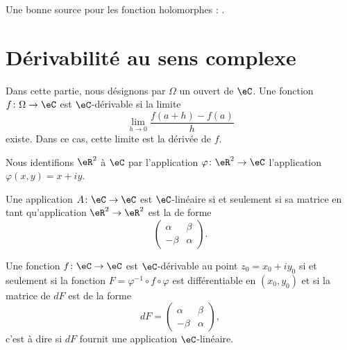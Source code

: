 
Une bonne source pour les fonction holomorphes : \cite{Holomorphieus}.

\section{Dérivabilité au sens complexe}

Dans cette partie, nous désignons par \( \Omega\) un ouvert de \( \eC\). Une fonction \( f\colon \Omega\to \eC\) est $\eC$-dérivable si la limite
\begin{equation}
    \lim_{h\to 0} \frac{ f(a+h)-f(a) }{ h }
\end{equation}
existe. Dans ce cas, cette limite est la dérivée de \( f\).

Nous identifions \( \eR^2\) à \( \eC\) par l'application \( \varphi\colon \eR^2\to \eC\) l'application \( \varphi(x,y)=x+iy\).

\begin{lemma}
    Une application \( A\colon \eC\to \eC\) est \( \eC\)-linéaire si et seulement si sa matrice en tant qu'application \( \eR^2\to \eR^2\) est la de forme
    \begin{equation}
        \begin{pmatrix}
            \alpha    &   \beta    \\ 
            -\beta    &   \alpha    
        \end{pmatrix}.
    \end{equation}
\end{lemma}

\begin{proposition}
    Une fonction \( f\colon \eC\to \eC\) est $\eC$-dérivable au point \( z_0=x_0+iy_0\) si et seulement si la fonction \( F=\varphi^{-1}\circ f\circ \varphi\) est différentiable en \( (x_0,y_0)\) et si la matrice de \( dF\) est de la forme
    \begin{equation}
        dF=\begin{pmatrix}
            \alpha    &   \beta    \\ 
            -\beta    &   \alpha    
        \end{pmatrix},
    \end{equation}
    c'est à dire si \( dF\) fournit une application \( \eC\)-linéaire.
\end{proposition}

